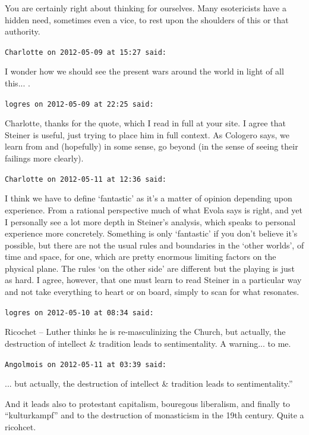 \begin{footnotesize}
\begin{sffamily}
You are certainly right about thinking for ourselves. Many esotericists have a hidden need, sometimes even a vice, to rest upon the shoulders of this or that authority.

\hfill

\texttt{Charlotte on 2012-05-09 at 15:27 said:}

I wonder how we should see the present wars around the world in light of all this... .

\hfill

\texttt{logres on 2012-05-09 at 22:25 said:}

Charlotte, thanks for the quote, which I read in full at your site. I agree that Steiner is useful, just trying to place him in full context. As Cologero says, we learn from and (hopefully) in some sense, go beyond (in the sense of seeing their failings more clearly).

\hfill

\texttt{Charlotte on 2012-05-11 at 12:36 said:}

I think we have to define `fantastic' as it's a matter of opinion depending upon experience. From a rational perspective much of what Evola says is right, and yet I personally see a lot more depth in Steiner's analysis, which speaks to personal experience more concretely. Something is only `fantastic' if you don't believe it's possible, but there are not the usual rules and boundaries in the `other worlds', of time and space, for one, which are pretty enormous limiting factors on the physical plane. The rules `on the other side' are different but the playing is just as hard. I agree, however, that one must learn to read Steiner in a particular way and not take everything to heart or on board, simply to scan for what resonates.

\hfill
\texttt{logres on 2012-05-10 at 08:34 said:}

Ricochet -- Luther thinks he is re-masculinizing the Church, but actually, the destruction of intellect \& tradition leads to sentimentality. A warning... to me.

\hfill

\texttt{Angolmois on 2012-05-11 at 03:39 said:}

... but actually, the destruction of intellect \& tradition leads to sentimentality.''

And it leads also to protestant capitalism, bouregous liberalism, and finally to ``kulturkampf'' and to the destruction of monasticism in the 19th century. Quite a ricohcet.


\end{sffamily}
\end{footnotesize}

